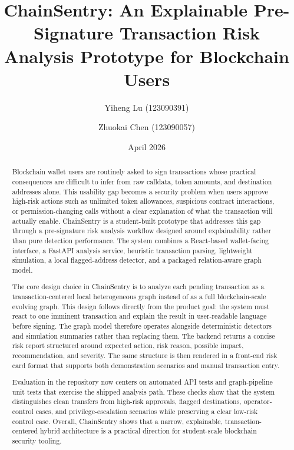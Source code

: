 \documentclass[11pt]{article}
\title{ChainSentry: An Explainable Pre-Signature Transaction Risk Analysis Prototype for Blockchain Users}
\author{Yiheng Lu (123090391) \and Zhuokai Chen (123090057)}
\date{April 2026}
\begin{document}
\maketitle

\begin{abstract}
Blockchain wallet users are routinely asked to sign transactions whose practical consequences are difficult to infer from raw calldata, token amounts, and destination addresses alone. This usability gap becomes a security problem when users approve high-risk actions such as unlimited token allowances, suspicious contract interactions, or permission-changing calls without a clear explanation of what the transaction will actually enable. ChainSentry is a student-built prototype that addresses this gap through a pre-signature risk analysis workflow designed around explainability rather than pure detection performance. The system combines a React-based wallet-facing interface, a FastAPI analysis service, heuristic transaction parsing, lightweight simulation, a local flagged-address detector, and a packaged relation-aware graph model.

The core design choice in ChainSentry is to analyze each pending transaction as a transaction-centered local heterogeneous graph instead of as a full blockchain-scale evolving graph. This design follows directly from the product goal: the system must react to one imminent transaction and explain the result in user-readable language before signing. The graph model therefore operates alongside deterministic detectors and simulation summaries rather than replacing them. The backend returns a concise risk report structured around expected action, risk reason, possible impact, recommendation, and severity. The same structure is then rendered in a front-end risk card format that supports both demonstration scenarios and manual transaction entry.

Evaluation in the repository now centers on automated API tests and graph-pipeline unit tests that exercise the shipped analysis path. These checks show that the system distinguishes clean transfers from high-risk approvals, flagged destinations, operator-control cases, and privilege-escalation scenarios while preserving a clear low-risk control case. Overall, ChainSentry shows that a narrow, explainable, transaction-centered hybrid architecture is a practical direction for student-scale blockchain security tooling.
\end{abstract}

\tableofcontents
\newpage
\end{document}
